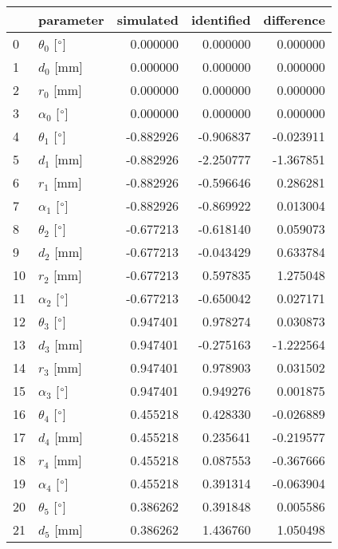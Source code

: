 \documentclass{standalone}%
\begin{document}
%
\normalsize%
\begin{tabular}{llrrr}
\toprule
{} &                 parameter & simulated & identified & difference \\
\midrule
0  &  $\theta_{0}$ [$\degree$] &  0.000000 &   0.000000 &   0.000000 \\
1  &              $d_{0}$ [mm] &  0.000000 &   0.000000 &   0.000000 \\
2  &              $r_{0}$ [mm] &  0.000000 &   0.000000 &   0.000000 \\
3  &  $\alpha_{0}$ [$\degree$] &  0.000000 &   0.000000 &   0.000000 \\
4  &  $\theta_{1}$ [$\degree$] & -0.882926 &  -0.906837 &  -0.023911 \\
5  &              $d_{1}$ [mm] & -0.882926 &  -2.250777 &  -1.367851 \\
6  &              $r_{1}$ [mm] & -0.882926 &  -0.596646 &   0.286281 \\
7  &  $\alpha_{1}$ [$\degree$] & -0.882926 &  -0.869922 &   0.013004 \\
8  &  $\theta_{2}$ [$\degree$] & -0.677213 &  -0.618140 &   0.059073 \\
9  &              $d_{2}$ [mm] & -0.677213 &  -0.043429 &   0.633784 \\
10 &              $r_{2}$ [mm] & -0.677213 &   0.597835 &   1.275048 \\
11 &  $\alpha_{2}$ [$\degree$] & -0.677213 &  -0.650042 &   0.027171 \\
12 &  $\theta_{3}$ [$\degree$] &  0.947401 &   0.978274 &   0.030873 \\
13 &              $d_{3}$ [mm] &  0.947401 &  -0.275163 &  -1.222564 \\
14 &              $r_{3}$ [mm] &  0.947401 &   0.978903 &   0.031502 \\
15 &  $\alpha_{3}$ [$\degree$] &  0.947401 &   0.949276 &   0.001875 \\
16 &  $\theta_{4}$ [$\degree$] &  0.455218 &   0.428330 &  -0.026889 \\
17 &              $d_{4}$ [mm] &  0.455218 &   0.235641 &  -0.219577 \\
18 &              $r_{4}$ [mm] &  0.455218 &   0.087553 &  -0.367666 \\
19 &  $\alpha_{4}$ [$\degree$] &  0.455218 &   0.391314 &  -0.063904 \\
20 &  $\theta_{5}$ [$\degree$] &  0.386262 &   0.391848 &   0.005586 \\
21 &              $d_{5}$ [mm] &  0.386262 &   1.436760 &   1.050498 \\

\end{tabular}
\end{document}
